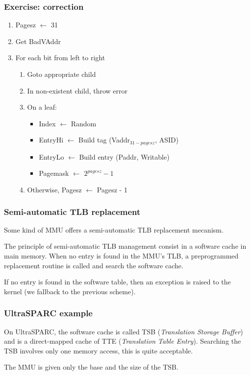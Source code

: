 \begin{frame}
  \frametitle{Exercise: correction}

  \begin{enumerate}
  \item
    Pagesz $\leftarrow$ 31
  \item
    Get BadVAddr
  \item
    For each bit from left to right
    \begin{enumerate}
    \item
      Goto appropriate child
    \item
      In non-existent child, throw error
    \item
      On a leaf:
      \begin{itemize}
      \item
        Index $\leftarrow$ Random
      \item
        EntryHi $\leftarrow$ Build tag (Vaddr$_{31-pagesz}$, ASID)
      \item
        EntryLo $\leftarrow$ Build entry (Paddr, Writable)
      \item
        Pagemask $\leftarrow$ $2^{pagesz}-1$
      \end{itemize}
    \item
      Otherwise, Pagesz $\leftarrow$ Pagesz - 1
    \end{enumerate}
  \end{enumerate}

\end{frame}


\begin{frame}
  \frametitle{Semi-automatic TLB replacement}

  Some kind of MMU offers a semi-automatic TLB replacement mecanism.

  \-

  The principle of semi-automatic TLB management consist in a software
  cache in main memory. When no entry is found in the MMU's TLB, a
  preprogrammed replacement routine is called and search the software
  cache.

  \-

  If no entry is found in the software table, then an exception is
  raised to the kernel (we fallback to the previous scheme).

\end{frame}


\begin{frame}
  \frametitle{UltraSPARC example}

  On UltraSPARC, the software cache is called TSB (\emph{Translation
  Storage Buffer}) and is a direct-mapped cache of TTE
  (\emph{Translation Table Entry}). Searching the TSB involves only
  one memory access, this is quite acceptable.

  \-

  \begin{center}
  \end{center}

  The MMU is given only the base and the size of the TSB.

\end{frame}

